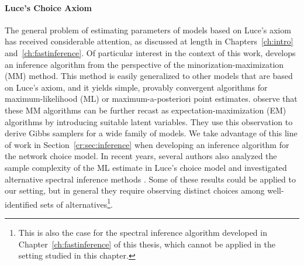 \paragraph{Luce's Choice Axiom}
The general problem of estimating parameters of models based on Luce's axiom has received considerable attention, as discussed at length in Chapters~\ref{ch:intro} and~\ref{ch:fastinference}.
Of particular interest in the context of this work, \citet{hunter2004mm} develops an inference algorithm from the perspective of the minorization-maximization (MM) method.
This method is easily generalized to other models that are based on Luce's axiom, and it yields simple, provably convergent algorithms for maximum-likelihood (ML) or maximum-a-posteriori point estimates.
\citet{caron2012efficient} observe that these MM algorithms can be further recast as expectation-maximization (EM) algorithms by introducing suitable latent variables.
They use this observation to derive Gibbs samplers for a wide family of models.
We take advantage of this line of work in Section~\ref{cr:sec:inference} when developing an inference algorithm for the network choice model.
In recent years, several authors also analyzed the sample complexity of the ML estimate in Luce's choice model \citep{hajek2014minimax, vojnovic2016parameter} and investigated alternative spectral inference methods \citep{negahban2012iterative, azari2013generalized}.
Some of these results could be applied to our setting, but in general they require observing distinct choices among well-identified sets of alternatives\footnote{%
This is also the case for the spectral inference algorithm developed in Chapter~\ref{ch:fastinference} of this thesis, which cannot be applied in the setting studied in this chapter.
}.

